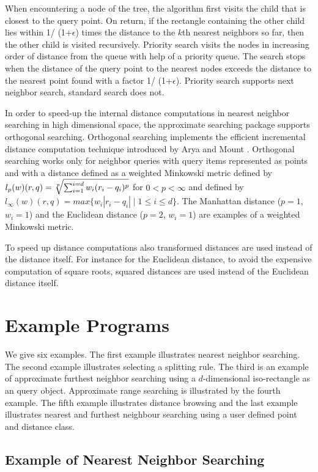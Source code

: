 When encountering a node of the tree, the algorithm first visits the child that is closest
to the query point. On return, if the rectangle containing  the other child lies within
1/ (1+$\epsilon$) times the distance to the $k$th nearest neighbors so far, then
the other child is visited recursively.
Priority search \cite{am-annqf-93} visits the nodes in increasing order of distance from
the queue with help of a priority queue.
The search stops when the distance of the query point to the nearest nodes
exceeds the distance to the nearest point found with a factor 1/ (1+$\epsilon$).
Priority search supports next neighbor search, standard search does not.

In order to speed-up the internal distance computations in nearest neighbor searching
in high dimensional space, the approximate searching package supports orthogonal searching. Orthogonal
searching implements the efficient incremental distance computation
technique introduced by Arya and Mount \cite{am-afvq-93}.
Orthogonal searching works only for neighbor queries with query items represented as
points and with a distance defined as a weighted Minkowski metric
defined by $l_p(w)(r,q)=\root p\of {\sum_{i=1}^{i=d} w_i(r_i-q_i)^p}$ for $0 < p <\infty$ and
defined by $l_{\infty}(w)(r,q)=max \{w_i |r_i-q_i| \mid 1 \leq i \leq d\}$. 
The Manhattan distance ($p=1$, $w_i=1$) and the
Euclidean distance ($p=2$, $w_i=1$) are examples of a weighted Minkowski metric.

To speed up distance computations also transformed
distances are used instead of the distance itself. 
For instance for the Euclidean distance, to avoid the expensive computation
of square roots, squared distances are used instead of the Euclidean distance itself. 


\section{Example Programs}

We give six examples. 
The first example illustrates nearest neighbor searching.
The second example illustrates selecting a splitting rule.
The third is an example of approximate furthest neighbor searching using a $d$-dimensional
iso-rectangle as an query object.
Approximate range
searching is illustrated by the fourth example.
The fifth example illustrates distance browsing and the last example illustrates 
nearest and furthest neighbour searching using
a user defined point and distance class.

\subsection{Example of Nearest Neighbor Searching}

